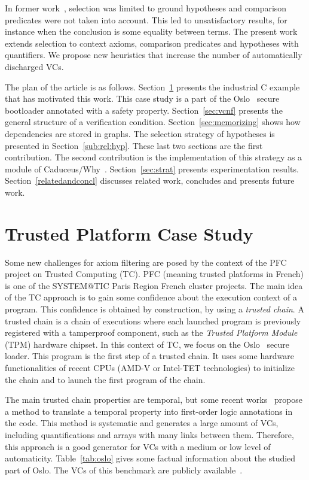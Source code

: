 \documentclass{acm_proc_article-sp}
\theoremstyle{nonumberplain}
\begin{document}
In former work~\cite{couchot07FTP}, selection was limited to ground
hypotheses and comparison predicates were not taken into account. This
led to unsatisfactory results, for instance when the conclusion is some
equality between terms. The present work extends selection to context
axioms, comparison predicates and hypotheses with quantifiers.
We propose new heuristics that increase the number of automatically
discharged VCs.



The plan of the article is as follows. Section~\ref{trusted:sec}
presents the industrial C example that has motivated this work. This
case study is a part of the Oslo~\cite{Oslo} secure bootloader
annotated with a safety property. Section~\ref{sec:vcnf} presents the
general structure of a verification condition.
Section~\ref{sec:memorizing} shows how dependencies are stored in
graphs. The selection strategy of hypotheses is presented in
Section~\ref{sub:rel:hyp}. These last two sections are the first
contribution. The second contribution is the implementation of this
strategy as a module of Caduceus/Why~\cite{filliatre07cav}.
Section~\ref{sec:strat} presents experimentation results.
Section~\ref{relatedandconcl} discusses related work, concludes and
presents future work.
\section{Trusted Platform Case Study}
\label{trusted:sec}
Some new challenges for axiom filtering are posed by the context of the
PFC project on Trusted Computing (TC). PFC (meaning trusted platforms
in French) is one of the SYSTEM@TIC Paris Region French cluster
projects.
The main idea of the TC approach is to gain some confidence about
the execution context of a program. This confidence is obtained by
construction, by using a \textit{trusted chain}. A trusted chain is a
chain of executions where each launched program is previously
registered with a tamperproof component, such as the \textit{Trusted
Platform Module} (TPM) hardware chipset.
In this context of TC, we focus on the Oslo~\cite{Oslo} secure loader.
This program is the first step of a trusted chain. It uses some
hardware functionalities of recent CPUs (AMD-V or Intel-TET
  technologies) to initialize the chain and to launch the first
program of the chain.



The main trusted chain properties are temporal, but some recent
works~\cite{JAG_GG06,GS09} propose a method to translate a temporal
property into first-order logic annotations in the code. This method is
systematic and generates a large amount of VCs, including
quantifications and arrays with many links between them. Therefore,
this approach is a good generator for VCs with a medium or low level of
automaticity.
Table~\ref{tab:oslo} gives some factual information about the studied
part of Oslo. The VCs of this benchmark are publicly
available~\cite{osloNS}.
\end{document}
